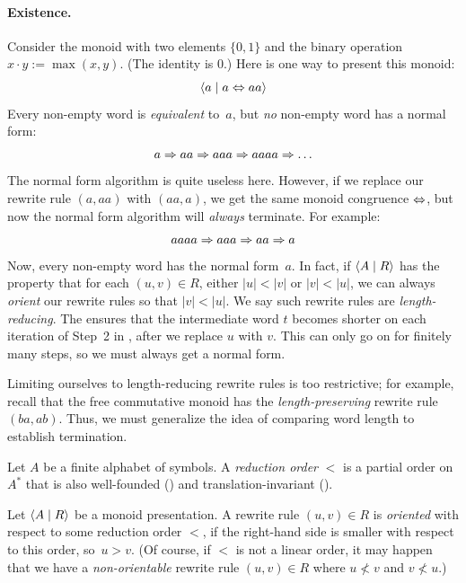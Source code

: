 \documentclass[../generics]{subfiles}
\begin{document}
\paragraph{Existence.} Consider the monoid with two elements $\{0,1\}$ and the binary operation $x\cdot y:=\max(x,y)$. (The identity is 0.) Here is one way to present this monoid:
\[ \langle a \mid a\Leftrightarrow aa\rangle \]
Every non-empty word is \emph{equivalent} to~$a$, but \emph{no} non-empty word has a normal form:
\[ a \Rightarrow aa \Rightarrow aaa \Rightarrow aaaa \Rightarrow \ldots \]
The normal form algorithm is quite useless here. However, if we replace our rewrite rule $(a, aa)$ with $(aa, a)$, we get the same monoid congruence $\Leftrightarrow$, but now the normal form algorithm will \emph{always} terminate. For example:
\[ aaaa \Rightarrow aaa \Rightarrow aa \Rightarrow a \]
Now, every non-empty word has the normal form~$a$. In fact, if $\langle A \mid R\rangle$ has the property that for each $(u,v)\in R$, either $|u|<|v|$ or $|v|<|u|$, we can always \emph{orient} our rewrite rules so that $|v|<|u|$. We say such rewrite rules are \emph{length-reducing}. The ensures that the intermediate word $t$ becomes shorter on each iteration of Step~2 in , after we replace $u$ with $v$. This can only go on for finitely many steps, so we must always get a normal form.

Limiting ourselves to length-reducing rewrite rules is too restrictive; for example, recall that the free commutative monoid has the \emph{length-preserving} rewrite rule $(ba, ab)$. Thus, we must generalize the idea of comparing word length to establish termination.

\begin{definition}\label{reduction order def}
Let $A$ be a finite alphabet of symbols. A \emph{reduction order} $<$ is a partial order on $A^*$ that is also well-founded () and translation-invariant ().
\end{definition}

\begin{definition}
Let $\langle A \mid R\rangle$ be a monoid presentation. A rewrite rule $(u,v)\in R$ is \emph{oriented} with respect to some reduction order $<$, if the right-hand side is smaller with respect to this order, so~$u>v$. (Of course, if $<$ is not a linear order, it may happen that we have a \emph{non-orientable} rewrite rule $(u,v)\in R$ where $u\not< v$ and $v\not< u$.)
\end{definition}
\end{document}
